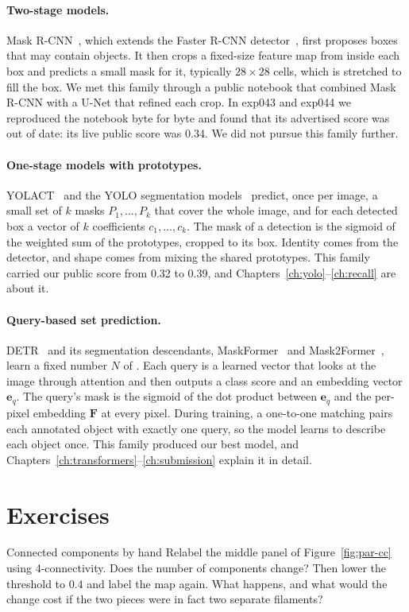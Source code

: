 \paragraph{Two-stage models.} Mask R-CNN~\citep{maskrcnn}, which extends the Faster R-CNN
detector~\citep{ren2015}, first proposes boxes that may contain objects. It then crops a fixed-size feature map from inside each box and predicts a small mask for
it, typically $28\times28$ cells, which is stretched to fill the box. We met this family through a
public notebook that combined Mask R-CNN with a U-Net that refined each crop. In exp043 and exp044
we reproduced the notebook byte for byte and found that its advertised score was out of date: its
live public score was 0.34. We did not pursue this family further.

\paragraph{One-stage models with prototypes.} YOLACT~\citep{yolact} and the YOLO segmentation
models~\citep{yolo,ultralytics} predict, once per image, a small set of $k$ 
masks $P_1,\dots,P_k$ that cover the whole image, and for each detected box a vector of $k$
coefficients $c_1,\dots,c_k$. The mask of a detection is the sigmoid of the weighted sum of the
prototypes, cropped to its box. Identity comes from the detector, and shape comes from mixing the
shared prototypes. This family carried our public score from 0.32 to 0.39, and
Chapters~\ref{ch:yolo}--\ref{ch:recall} are about it.

\paragraph{Query-based set prediction.} DETR~\citep{detr} and its segmentation descendants,
MaskFormer~\citep{maskformer} and Mask2Former~\citep{mask2former}, learn a fixed number $N$ of
. Each query is a learned vector that looks at the image through attention and
then outputs a class score and an embedding vector $\mathbf{e}_q$. The query's mask is the sigmoid
of the dot product between $\mathbf{e}_q$ and the per-pixel embedding $\mathbf{F}$ at every pixel.
During training, a one-to-one matching pairs each annotated object with exactly one query, so the
model learns to describe each object once. This family produced our best model, and
Chapters~\ref{ch:transformers}--\ref{ch:submission} explain it in detail.

\section*{Exercises}
\begin{exercise}{Connected components by hand}
Relabel the middle panel of Figure~\ref{fig:par-cc} using 4-connectivity. Does the number of
components change? Then lower the threshold to 0.4 and label the map again. What happens, and what
would the change cost if the two pieces were in fact two separate filaments?
\end{exercise}

